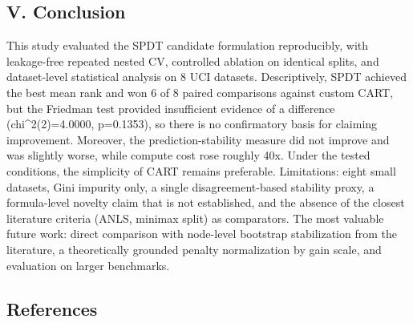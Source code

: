 \documentclass[
  conference]{IEEEtran}
\begin{document}
\subsection{V. Conclusion}\label{v.-conclusion}

This study evaluated the SPDT candidate formulation reproducibly, with
leakage-free repeated nested CV, controlled ablation on identical
splits, and dataset-level statistical analysis on 8 UCI datasets.
Descriptively, SPDT achieved the best mean rank and won 6 of 8 paired
comparisons against custom CART, but the Friedman test provided
insufficient evidence of a difference (chi\^{}2(2)=4.0000, p=0.1353), so
there is no confirmatory basis for claiming improvement. Moreover, the
prediction-stability measure did not improve and was slightly worse,
while compute cost rose roughly 40x. Under the tested conditions, the
simplicity of CART remains preferable. Limitations: eight small
datasets, Gini impurity only, a single disagreement-based stability
proxy, a formula-level novelty claim that is not established, and the
absence of the closest literature criteria (ANLS, minimax split) as
comparators. The most valuable future work: direct comparison with
node-level bootstrap stabilization from the literature, a theoretically
grounded penalty normalization by gain scale, and evaluation on larger
benchmarks.

\subsection{References}\label{references}
\end{document}
